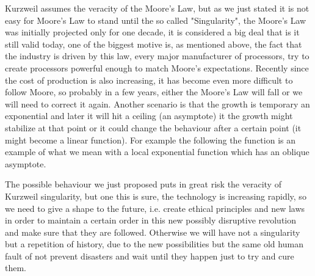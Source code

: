 \documentclass[12pt, a4page]{article}
\begin{document}
Kurzweil assumes the veracity of the Moore's Law, but as we just stated it is not easy for Moore's Law to stand until the so called "Singularity", the Moore's Law was initially projected only for one decade, it is considered a big deal that is it still valid today, one of the biggest motive is, as mentioned above, the fact that the industry is driven by this law, every major manufacturer of processors, try to create processors powerful enough to match Moore's expectations. Recently since the cost of production is also increasing, it has become even more difficult to follow Moore, so probably in a few years, either the Moore's Law will fall or we will need to correct it again. Another scenario is that the growth is temporary an exponential and later it will hit a ceiling (an asymptote) it the growth might stabilize at that point or it could change the behaviour after a certain point (it might become a linear function). For example the following the function is an example of what we mean with a local exponential function which has an oblique asymptote.
\newline
{}
\newline
The possible behaviour we just proposed puts in great risk the veracity of Kurzweil singularity, but one this is sure, the technology is increasing rapidly, so we need to give a shape to the future, i.e. create ethical principles and new laws in order to maintain a certain order in this new possibly disruptive revolution and make sure that they are followed. Otherwise we will have not a singularity but a repetition of history, due to the new possibilities but the same old human fault of not prevent disasters and wait until they happen just to try and cure them.
\newpage

\printbibliography
\end{document}
